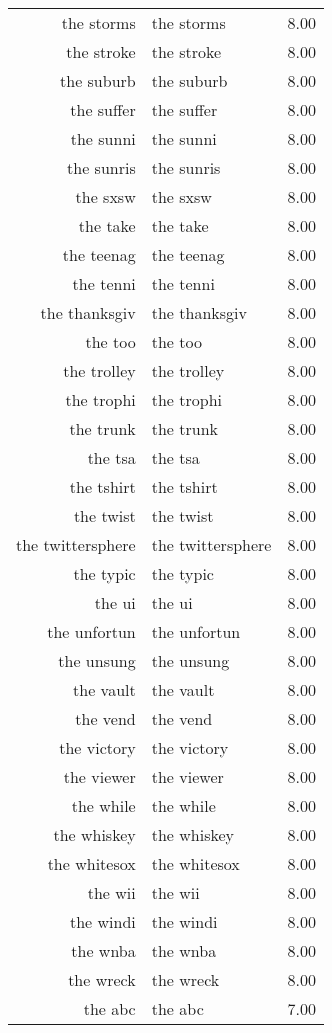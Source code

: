 \begin{table}[ht]
\begin{tabular}{rlr}
  the storms & the storms & 8.00 \\ 
  the stroke & the stroke & 8.00 \\ 
  the suburb & the suburb & 8.00 \\ 
  the suffer & the suffer & 8.00 \\ 
  the sunni & the sunni & 8.00 \\ 
  the sunris & the sunris & 8.00 \\ 
  the sxsw & the sxsw & 8.00 \\ 
  the take & the take & 8.00 \\ 
  the teenag & the teenag & 8.00 \\ 
  the tenni & the tenni & 8.00 \\ 
  the thanksgiv & the thanksgiv & 8.00 \\ 
  the too & the too & 8.00 \\ 
  the trolley & the trolley & 8.00 \\ 
  the trophi & the trophi & 8.00 \\ 
  the trunk & the trunk & 8.00 \\ 
  the tsa & the tsa & 8.00 \\ 
  the tshirt & the tshirt & 8.00 \\ 
  the twist & the twist & 8.00 \\ 
  the twittersphere & the twittersphere & 8.00 \\ 
  the typic & the typic & 8.00 \\ 
  the ui & the ui & 8.00 \\ 
  the unfortun & the unfortun & 8.00 \\ 
  the unsung & the unsung & 8.00 \\ 
  the vault & the vault & 8.00 \\ 
  the vend & the vend & 8.00 \\ 
  the victory & the victory & 8.00 \\ 
  the viewer & the viewer & 8.00 \\ 
  the while & the while & 8.00 \\ 
  the whiskey & the whiskey & 8.00 \\ 
  the whitesox & the whitesox & 8.00 \\ 
  the wii & the wii & 8.00 \\ 
  the windi & the windi & 8.00 \\ 
  the wnba & the wnba & 8.00 \\ 
  the wreck & the wreck & 8.00 \\ 
  the abc & the abc & 7.00 \\ 

\end{tabular}
\end{table}
